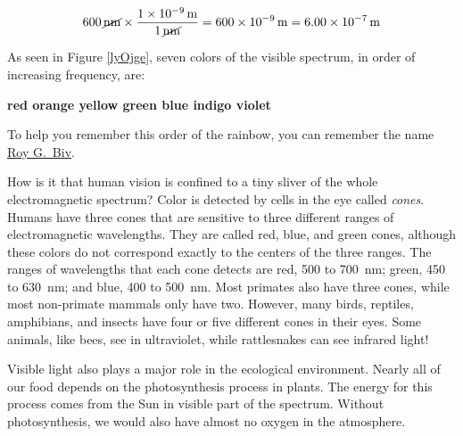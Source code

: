 \documentclass[main.tex]{subfiles}
\begin{document}
\begin{equation*}
    \SI{600}{\cancel\nano\meter} \times \frac{\SI{1e-9}{m}}{\SI{1}{\cancel\nano\meter}} = \SI{600e-9}{m} = \SI{6.00e-7}{m}
\end{equation*}

\solutionEnd

\vspace{1ex}

As seen in Figure \ref{lyOjge}, seven colors of the visible spectrum, in order of increasing frequency, are:

\begin{mdframed}[backgroundcolor=black!10]
\begin{center}
    \textbf{\hspace{5mm}
    red \hfill
    orange \hfill
    yellow \hfill
    green \hfill
    blue \hfill 
    indigo \hfill 
    violet \hspace{3mm} \hfill}
\end{center}
\end{mdframed}

To help you remember this order of the rainbow, you can remember the name \href{https://youtu.be/Gf33ueRXMzQ}{Roy G.~Biv}.

\vspace{1em}

How is it that human vision is confined to a tiny sliver of the whole electromagnetic spectrum? Color is detected by cells in the eye called \textit{cones}. Humans have three cones that are sensitive to three different ranges of electromagnetic wavelengths. They are called red, blue, and green cones, although these colors do not correspond exactly to the centers of the three ranges. The ranges of wavelengths that each cone detects are red, 500 to \SI{700}{nm}; green, 450 to \SI{630}{nm}; and blue, 400 to \SI{500}{nm}. Most primates also have three cones, while most non-primate mammals only have two. However, many birds, reptiles, amphibians, and insects have four or five different cones in their eyes. Some animals, like bees, see in ultraviolet, while rattlesnakes can see infrared light!

\vspace{1em}

Visible light also plays a major role in the ecological environment. Nearly all of our food depends on the photosynthesis process in plants. The energy for this process comes from the Sun in visible part of the spectrum. Without photosynthesis, we would also have almost no oxygen in the atmosphere.
\end{document}
